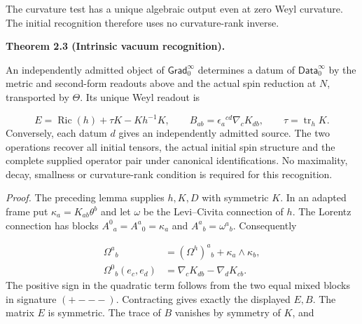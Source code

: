 \documentclass[
  english,
  11pt,
  reqno]{amsart}
\makeatletter
\newcommand{\pandocstatementheading}[1]{%
  \par\addpenalty{\@beginparpenalty}%
  \addvspace{.5\baselineskip plus .2\baselineskip minus .2\baselineskip}%
  {\normalfont\bfseries #1\par}%
  \nobreak\@afterindenttrue\@afterheading
}
\makeatother
\begin{document}
The curvature test has a unique algebraic output even at zero Weyl
curvature. The initial recognition therefore uses no curvature-rank
inverse.

\pandocstatementheading{\leavevmode{}\label{thm:online-intrinsic-gradient-vacuum-recognition}Theorem 2.3 (Intrinsic vacuum recognition).}

An independently admitted object of \(\mathsf{Grad}_0^\infty\)
determines a datum of \(\mathsf{Data}_0^\infty\) by the metric and
second-form readouts above and the actual spin reduction at \(N\),
transported by \(\Theta\). Its unique Weyl readout is

\label{eq:online-intrinsic-gauss-codazzi-readout} \[
E=\operatorname{Ric}(h)+\tau K-Kh^{-1}K,\qquad
B_{ab}=\epsilon_a{}^{cd}\nabla_cK_{db},
\qquad \tau=\operatorname{tr}_hK.
\] Conversely, each datum \(d\) gives an independently admitted source.
The two operations recover all initial tensors, the actual initial spin
structure and the complete supplied operator pair under canonical
identifications. No maximality, decay, smallness or curvature-rank
condition is required for this recognition.

\emph{Proof.} The preceding lemma supplies \(h,K,D\) with symmetric
\(K\). In an adapted frame put \(\kappa_a=K_{ab}\theta^b\) and let
\(\omega\) be the Levi--Civita connection of \(h\). The Lorentz
connection has blocks \(A^0{}_a=A^a{}_0=\kappa_a\) and
\(A^a{}_b=\omega^a{}_b\). Consequently

\label{eq:online-intrinsic-gauss-codazzi-blocks} \[
\begin{aligned}
\Omega^a{}_b&=(\Omega^h)^a{}_b+\kappa_a\wedge\kappa_b,\\
\Omega^0{}_b(e_c,e_d)&=\nabla_cK_{db}-\nabla_dK_{cb}.
\end{aligned}
\] The positive sign in the quadratic term follows from the two equal
mixed blocks in signature \((+---)\). Contracting gives exactly the
displayed \(E,B\). The matrix \(E\) is symmetric. The trace of \(B\)
vanishes by symmetry of \(K\), and
\end{document}
